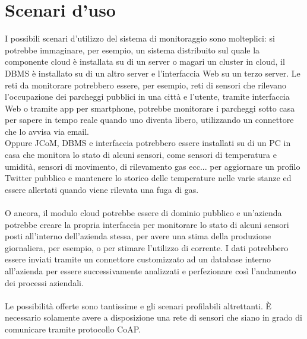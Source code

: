 \section{Scenari d'uso}
I possibili scenari d'utilizzo del sistema di monitoraggio sono molteplici: si potrebbe immaginare, per esempio, un sistema distribuito sul quale la componente cloud è installata su di un server o magari un cluster in cloud, il DBMS è installato su di un altro server e l'interfaccia Web su un terzo server. Le reti da monitorare potrebbero essere, per esempio, reti di sensori che rilevano l'occupazione dei parcheggi pubblici in una città e l'utente, tramite interfaccia Web o tramite app per smartphone, potrebbe monitorare i parcheggi sotto casa per sapere in tempo reale quando uno diventa libero, utilizzando un connettore che lo avvisa via email.
\\Oppure JCoM, DBMS e interfaccia potrebbero essere installati su di un PC in casa che monitora lo stato di alcuni sensori, come sensori di temperatura e umidità, sensori di movimento, di rilevamento gas ecc... per aggiornare un profilo Twitter pubblico e mantenere lo storico delle temperature nelle varie stanze ed essere allertati quando viene rilevata una fuga di gas.
\\\\O ancora, il modulo cloud potrebbe essere di dominio pubblico e un'azienda potrebbe creare la propria interfaccia per monitorare lo stato di alcuni sensori posti all'interno dell'azienda stessa, per avere una stima della produzione giornaliera, per esempio, o per stimare l'utilizzo di corrente. I dati potrebbero essere inviati tramite un connettore customizzato ad un database interno all'azienda per essere successivamente analizzati e perfezionare così l'andamento dei processi aziendali.
\\\\Le possibilità offerte sono tantissime e gli scenari profilabili altrettanti. È necessario solamente avere a disposizione una rete di sensori che siano in grado di comunicare tramite protocollo CoAP.


